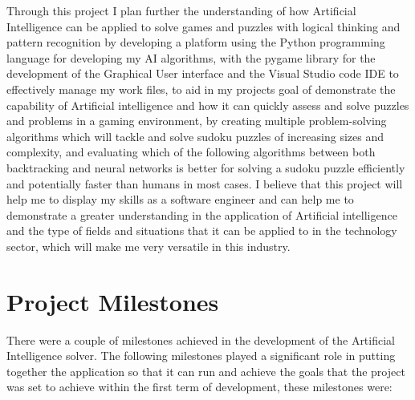 \documentclass[]{final_report}
\begin{document}
Through this project I plan further the understanding of how Artificial Intelligence can be applied to solve games and puzzles with logical thinking and pattern recognition by developing a platform using the Python programming language for developing my AI algorithms, with the pygame library for the development of the Graphical User interface and the Visual Studio code IDE to effectively manage my work files, to aid in my projects goal of demonstrate the capability of Artificial intelligence and how it can quickly assess and solve puzzles and problems in a gaming environment, by creating multiple problem-solving algorithms which will tackle and solve sudoku puzzles of increasing sizes and complexity, and evaluating which of the following algorithms between both backtracking and neural networks is better  for solving a sudoku puzzle efficiently and potentially faster than humans in most cases. I believe that this project will help me to display my skills as a software engineer and can help me to demonstrate a greater understanding in the application of Artificial intelligence and the type of fields and situations that it can be applied to in the technology sector, which will make me very versatile in this industry. 

\section{Project Milestones}

There were a couple of milestones achieved in the development of the Artificial Intelligence solver. The following milestones played a significant role in putting together the application so that it can run and achieve the goals that the project was set to achieve within the first term of development, these milestones were: 
\end{document}

